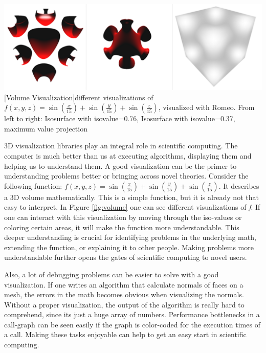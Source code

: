\vspace{1em}
\begin{minipage}{\linewidth}
    \centering
    \includegraphics[width=0.7\linewidth]{graphics/surfaces.png}
    [Volume Visualization]{different visualizations of $f(x,y,z)=\sin(\frac{x}{15})+\sin(\frac{y}{15})+\sin(\frac{z}{15})$, visualized with Romeo. From left to right: Isosurface with isovalue=0.76, Isosurface with isovalue=0.37, maximum value projection}
    \label{fig:volume}
\end{minipage}
\vspace{1em}

3D visualization libraries play an integral role in scientific computing.
The computer is much better than us at executing algorithms, displaying them and helping us to understand them.
A good visualization can be the primer to understanding problems better or bringing across novel theories.
Consider the following function: $f(x,y,z)=\sin(\frac{x}{15})+\sin(\frac{y}{15})+\sin(\frac{z}{15})$. 
It describes a 3D volume mathematically. 
This is a simple function, but it is already not that easy to interpret. In Figure \ref{fig:volume} one can see different visualizations of \textit{f}.
If one can interact with this visualization by moving through the iso-values or coloring certain areas, it will make the function more understandable.
This deeper understanding is crucial for identifying problems in the underlying math, extending the function, or explaining it to other people. 
Making problems more understandable further opens the gates of scientific computing to novel users.

Also, a lot of debugging problems can be easier to solve with a good visualization. 
If one writes an algorithm that calculate normals of faces on a mesh, the errors in the math becomes obvious when visualizing the normals. Without a proper visualization, the output of the algorithm is really hard to comprehend, since its just a huge array of numbers.
Performance bottlenecks in a call-graph can be seen easily if the graph is color-coded for the execution times of a call. 
Making these tasks enjoyable can help to get an easy start in scientific computing.

